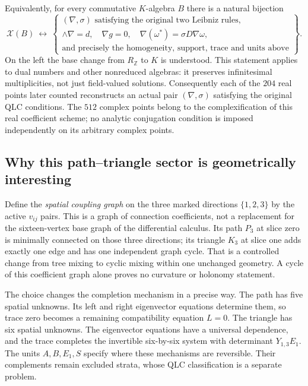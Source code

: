 \documentclass[11pt,a4paper]{article}
\theoremstyle{remark}\newtheorem{remark}[theorem]{Remark}
\begin{document}
Equivalently, for every commutative $K$-algebra $B$ there is a natural
bijection
\[
 \mathcal X(B)\ \longleftrightarrow\
 \left\{\begin{array}{c}
 (\nabla,\sigma)\text{ satisfying the original two Leibniz rules,}\\
 \wedge\nabla=d,\quad\nabla g=0,\quad
 \nabla(\omega^*)=\sigma D\nabla\omega,\\
 \text{and precisely the homogeneity, support, trace and units above}
 \end{array}\right\}.
\]
On the left the base change from $R_{\mathbb Z}$ to $K$ is understood.
This statement applies to dual numbers and other nonreduced algebras:
it preserves infinitesimal multiplicities, not just field-valued
solutions. Consequently each of the $204$ real points later counted
reconstructs an actual pair $(\nabla,\sigma)$ satisfying the original
QLC conditions. The $512$ complex points belong to the complexification
of this real coefficient scheme; no analytic conjugation condition
is imposed independently on its arbitrary complex points.

\subsection{Why this path--triangle sector is geometrically interesting}
\label{geometry:motivation}

Define the \emph{spatial coupling graph} on the three marked directions
$\{1,2,3\}$ by the active $v_{ij}$ pairs. This is a graph of
connection coefficients, not a replacement for the sixteen-vertex
base graph of the differential calculus. Its path $P_3$ at slice zero
is minimally connected on those three directions; its triangle $K_3$
at slice one adds exactly one edge and has one independent graph cycle.
That is a controlled change from tree mixing to cyclic mixing within
one unchanged geometry. A cycle of this coefficient graph alone
proves no curvature or holonomy statement.

The choice changes the completion mechanism in a precise way. The
path has five spatial unknowns. Its left and right eigenvector equations
determine them, so trace zero becomes a remaining compatibility equation
$L=0$. The triangle has six spatial unknowns. The eigenvector equations
have a universal dependence, and the trace completes the invertible
six-by-six system with determinant $Y_{1,3}E_1$. The units $A,B,E_1,S$
specify where these mechanisms are reversible. Their complements
remain excluded strata, whose QLC classification is a separate problem.
\end{document}
